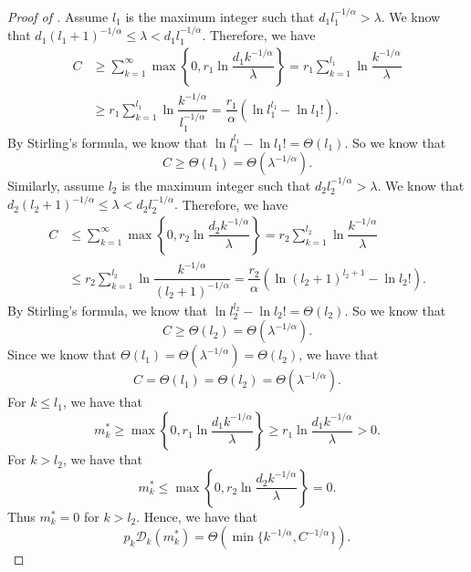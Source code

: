 \documentclass[11pt]{article}
\theoremstyle{plain}
\theoremstyle{definition}
\newcommand{\ratedistortion}{\mathcal{D}}
\begin{document}
\begin{proof}[Proof of ]
Assume $l_1$ is the maximum integer such that $d_1l_1^{-1/\alpha}> \lambda$. 
We know that $d_1(l_1+1)^{-1/\alpha}\le \lambda< d_1l_1^{-1/\alpha}.$ Therefore, we have
\begin{align*}
    C  & \ge \sum\limits_{k=1}^{\infty} \max\left\{0,r_1\ln \dfrac{d_1k^{-1/\alpha}}{\lambda}\right\}
    =r_1 \sum\limits_{k=1}^{l_1} \ln\dfrac{k^{-1/\alpha}}{\lambda} \\
    & \ge r_1\sum\limits_{k=1}^{l_1} \ln \dfrac{k^{-1/\alpha}}{l_1^{-1/\alpha}}
     =\dfrac{r_1}{\alpha}
     \left(\ln l_1^{l_1} - \ln l_1!\right).
\end{align*}
By Stirling's formula, we know that $\ln l_1^{l_1} - \ln l_1!=\Theta(l_1)$. So we know that 
\[
C\ge \Theta(l_1)=\Theta(\lambda^{-1/\alpha}).
\]
Similarly, assume $l_2$ is the maximum integer such that $d_2l_2^{-1/\alpha}> \lambda$. 
We know that $d_2(l_2+1)^{-1/\alpha}\le \lambda< d_2l_2^{-1/\alpha}.$ Therefore, we have
\begin{align*}
    C  & \le \sum\limits_{k=1}^{\infty} \max\left\{0,r_2\ln \dfrac{d_2k^{-1/\alpha}}{\lambda}\right\}
    =r_2 \sum\limits_{k=1}^{l_2} \ln\dfrac{k^{-1/\alpha}}{\lambda} \\
    & \le r_2\sum\limits_{k=1}^{l_2} \ln \dfrac{k^{-1/\alpha}}{(l_2+1)^{-1/\alpha}}
     =\dfrac{r_2}{\alpha}
     \left(\ln (l_2+1)^{l_2+1} - \ln l_2!\right).
\end{align*}
By Stirling's formula, we know that $\ln l_2^{l_2} - \ln l_2!=\Theta(l_2)$. So we know that 
\[
C\ge \Theta(l_2)=\Theta(\lambda^{-1/\alpha}).
\]
Since we know that $\Theta(l_1)=\Theta(\lambda^{-1/\alpha})=\Theta(l_2)$, we have that
\[
C=\Theta(l_1)=\Theta(l_2)=\Theta(\lambda^{-1/\alpha}).
\]
For $k\le l_1$, we have that
$$
m_k^*\ge \max\left\{0,r_1\ln \dfrac{d_1k^{-1/\alpha}}{\lambda}\right\}\ge r_1\ln \dfrac{d_1k^{-1/\alpha}}{\lambda}>0.
$$
For $k> l_2$, we have that
$$
m_k^*\le \max\left\{0,r_2\ln \dfrac{d_2k^{-1/\alpha}}{\lambda}\right\}=0.
$$
Thus $m_k^*=0$ for $k > l_2$.
Hence, we have that  \[p_k\ratedistortion_k(m_k^*)=\Theta(\min\{k^{-1/\alpha},C^{-1/\alpha}\}).\]


\end{proof}
\end{document}
